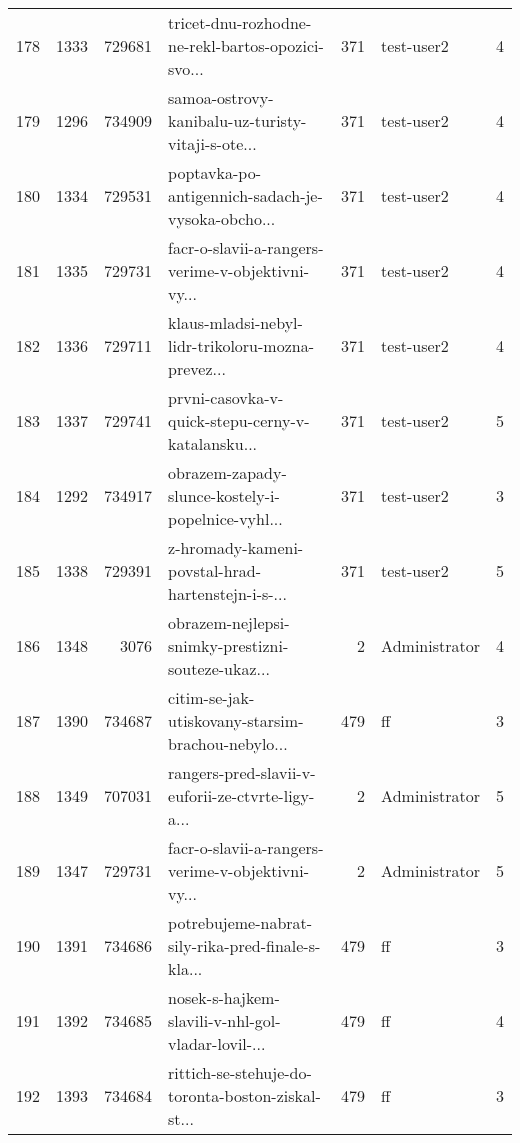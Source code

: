 \begin{tabular}{lrrlrlr}
178  &       1333 &   729681 &  tricet-dnu-rozhodne-ne-rekl-bartos-opozici-svo... &      371 &                   test-user2 &               4 \\
179  &       1296 &   734909 &  samoa-ostrovy-kanibalu-uz-turisty-vitaji-s-ote... &      371 &                   test-user2 &               4 \\
180  &       1334 &   729531 &  poptavka-po-antigennich-sadach-je-vysoka-obcho... &      371 &                   test-user2 &               4 \\
181  &       1335 &   729731 &  facr-o-slavii-a-rangers-verime-v-objektivni-vy... &      371 &                   test-user2 &               4 \\
182  &       1336 &   729711 &  klaus-mladsi-nebyl-lidr-trikoloru-mozna-prevez... &      371 &                   test-user2 &               4 \\
183  &       1337 &   729741 &  prvni-casovka-v-quick-stepu-cerny-v-katalansku... &      371 &                   test-user2 &               5 \\
184  &       1292 &   734917 &  obrazem-zapady-slunce-kostely-i-popelnice-vyhl... &      371 &                   test-user2 &               3 \\
185  &       1338 &   729391 &  z-hromady-kameni-povstal-hrad-hartenstejn-i-s-... &      371 &                   test-user2 &               5 \\
186  &       1348 &     3076 &  obrazem-nejlepsi-snimky-prestizni-souteze-ukaz... &        2 &                Administrator &               4 \\
187  &       1390 &   734687 &  citim-se-jak-utiskovany-starsim-brachou-nebylo... &      479 &                           ff &               3 \\
188  &       1349 &   707031 &  rangers-pred-slavii-v-euforii-ze-ctvrte-ligy-a... &        2 &                Administrator &               5 \\
189  &       1347 &   729731 &  facr-o-slavii-a-rangers-verime-v-objektivni-vy... &        2 &                Administrator &               5 \\
190  &       1391 &   734686 &  potrebujeme-nabrat-sily-rika-pred-finale-s-kla... &      479 &                           ff &               3 \\
191  &       1392 &   734685 &  nosek-s-hajkem-slavili-v-nhl-gol-vladar-lovil-... &      479 &                           ff &               4 \\
192  &       1393 &   734684 &  rittich-se-stehuje-do-toronta-boston-ziskal-st... &      479 &                           ff &               3 \\

\end{tabular}
